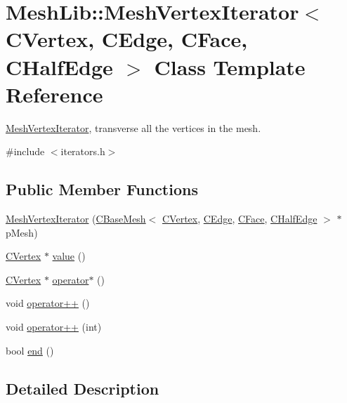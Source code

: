 \hypertarget{class_mesh_lib_1_1_mesh_vertex_iterator}{}\section{Mesh\+Lib\+:\+:Mesh\+Vertex\+Iterator$<$ C\+Vertex, C\+Edge, C\+Face, C\+Half\+Edge $>$ Class Template Reference}
\label{class_mesh_lib_1_1_mesh_vertex_iterator}


\hyperlink{class_mesh_lib_1_1_mesh_vertex_iterator}{Mesh\+Vertex\+Iterator}, transverse all the vertices in the mesh.  




{\ttfamily \#include $<$iterators.\+h$>$}

\subsection*{Public Member Functions}
\begin{DoxyCompactItemize}
\item 
\hyperlink{class_mesh_lib_1_1_mesh_vertex_iterator_ae75326d13fd8c38341a28a086acdfbfb}{Mesh\+Vertex\+Iterator} (\hyperlink{class_mesh_lib_1_1_c_base_mesh}{C\+Base\+Mesh}$<$ \hyperlink{class_mesh_lib_1_1_c_vertex}{C\+Vertex}, \hyperlink{class_mesh_lib_1_1_c_edge}{C\+Edge}, \hyperlink{class_mesh_lib_1_1_c_face}{C\+Face}, \hyperlink{class_mesh_lib_1_1_c_half_edge}{C\+Half\+Edge} $>$ $\ast$p\+Mesh)
\item 
\hyperlink{class_mesh_lib_1_1_c_vertex}{C\+Vertex} $\ast$ \hyperlink{class_mesh_lib_1_1_mesh_vertex_iterator_a78b2ebbdd0380157506863f7e96a2564}{value} ()
\item 
\hyperlink{class_mesh_lib_1_1_c_vertex}{C\+Vertex} $\ast$ \hyperlink{class_mesh_lib_1_1_mesh_vertex_iterator_a086d57086539abef934327eec690de55}{operator$\ast$} ()
\item 
void \hyperlink{class_mesh_lib_1_1_mesh_vertex_iterator_a53ed867e3dd65cbcd895fadde514cc2d}{operator++} ()
\item 
void \hyperlink{class_mesh_lib_1_1_mesh_vertex_iterator_acd9b0efcab873fe705aefe98911dad81}{operator++} (int)
\item 
bool \hyperlink{class_mesh_lib_1_1_mesh_vertex_iterator_a410667bdeda8f03d1f9a632ef54d5a59}{end} ()
\end{DoxyCompactItemize}


\subsection{Detailed Description}
